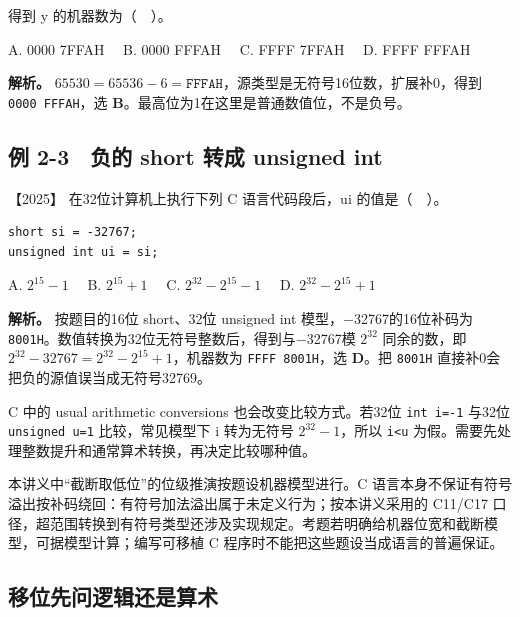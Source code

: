 得到 y 的机器数为（　）。

A. 0000 7FFAH　 B. 0000 FFFAH　 C. FFFF 7FFAH　 D. FFFF FFFAH


\textbf{解析。} \(65530=65536-6=\mathtt{FFFAH}\)，源类型是无符号16位数，扩展补0，得到 \allowbreak{}\texttt{0000\ FFFAH}，选 \textbf{B}。最高位为1在这里是普通数值位，不是负号。

\subsection{例 2-3　负的 short 转成 unsigned int}\label{co-ex2-3}

\noindent{}【2025】 在32位计算机上执行下列 C 语言代码段后，ui 的值是（　）。

\par\medskip\noindent
\begin{minipage}{\linewidth}
\begin{verbatim}
short si = -32767;
unsigned int ui = si;
\end{verbatim}
\end{minipage}\par\medskip

A. \(2^{15}-1\)　 B. \(2^{15}+1\)　 C. \(2^{32}-2^{15}-1\)　 D. \(2^{32}-2^{15}+1\)


\textbf{解析。} 按题目的16位 short、32位 unsigned int 模型，−32767的16位补码为 \allowbreak{}\texttt{8001H}。数值转换为32位无符号整数后，得到与−32767模 \(2^{32}\) 同余的数，即 \(2^{32}-32767=2^{32}-2^{15}+1\)，机器数为 \allowbreak{}\texttt{FFFF\ 8001H}，选 \textbf{D}。把 \allowbreak{}\texttt{8001H} 直接补0会把负的源值误当成无符号32769。

C 中的 usual arithmetic conversions 也会改变比较方式。若32位 \allowbreak{}\texttt{int\ i=-1} 与32位 \allowbreak{}\texttt{unsigned\ u=1} 比较，常见模型下 i 转为无符号 \(2^{32}-1\)，所以 \allowbreak{}\texttt{i\textless{}u} 为假。需要先处理整数提升和通常算术转换，再决定比较哪种值。

本讲义中``截断取低位''的位级推演按题设机器模型进行。C 语言本身不保证有符号溢出按补码绕回：有符号加法溢出属于未定义行为；按本讲义采用的 C11/C17 口径，超范围转换到有符号类型还涉及实现规定。考题若明确给机器位宽和截断模型，可据模型计算；编写可移植 C 程序时不能把这些题设当成语言的普遍保证。

\subsection{移位先问逻辑还是算术}\label{co-c02-h78}

